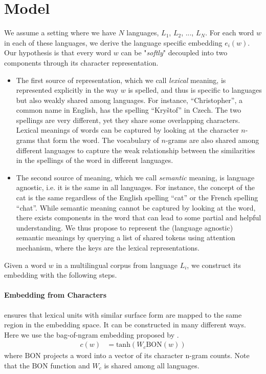 \section{\label{sec:model}Model}
We assume a setting where we have $N$ languages, $L_1$, $L_2$, ..., $L_N$. For each word $w$ in each of these languages, we derive the language specific embedding $e_i(w)$. Our hypothesis is that every word $w$ can be "\textit{softly}" decoupled into two components through its character representation.  
\begin{itemize}
  \item The first source of representation, which we call \textit{lexical} meaning, is represented explicitly in the way $w$ is spelled, and thus is specific to languages but also weakly shared among languages. For instance, ``Christopher'', a common name in English, has the spelling ``Kry\v{s}tof'' in Czech. The two spellings are very different, yet they share some overlapping characters. Lexical meanings of words can be captured by looking at the character $n$-grams that form the word. The vocabulary of $n$-grams are also shared among different languages to capture the weak relationship between the similarities in the spellings of the word in different languages.
  \item The second source of meaning, which we call \textit{semantic} meaning, is language agnostic, i.e. it is the same in all languages. For instance, the concept of the cat is the same regardless of the English spelling ``cat'' or the French spelling ``chat''. While semantic meaning cannot be captured by looking at the word, there exists components in the word that can lead to some partial and helpful understanding. We thus propose to represent the (language agnostic) semantic meanings by querying a list of shared tokens using attention mechanism, where the keys are the lexical representations.
\end{itemize}

Given a word $w$ in a multilingual corpus from language $L_i$, we construct its embedding with the following steps.

\paragraph{Embedding from Characters} ensures that lexical units with similar surface form are mapped to the same region in the embedding space. It can be constructed in many different ways. Here we use the bag-of-ngram embedding proposed by . 
\begin{align}
    c(w) &= \text{tanh}(W_c \text{BON}(w))
\end{align}
where $\text{BON}$ projects a word into a vector of its character n-gram counts. Note that the $\text{BON}$ function and $W_c$ is shared among all languages.

